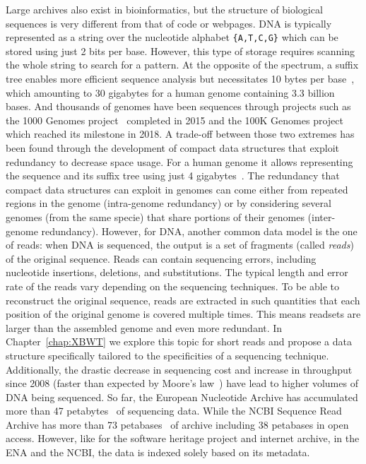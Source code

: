 Large archives also exist in bioinformatics, but the structure of biological sequences is very different from that of code or webpages.
DNA is typically represented as a string over the nucleotide alphabet \texttt{\{A,T,C,G\}} which can be stored using just 2 bits per base. However, this type of storage requires scanning the whole string to search for a pattern. 
At the opposite of the spectrum, a suffix tree enables more efficient sequence analysis but necessitates 10 bytes per base~\cite{navarro2016compact}, which amounting to 30 gigabytes for a human genome containing 3.3 billion bases. 
And thousands of genomes have been sequences through projects such as the 1000 Genomes project~\cite{10002015global} completed in 2015 and the 100K Genomes project~\cite{100Kgenomes} which reached its milestone in 2018. 
A trade-off between those two extremes has been found through the development of compact data structures that exploit redundancy to decrease space usage. For a human genome it allows representing the sequence and its suffix tree using just 4 gigabytes~\cite{navarro2016compact}.
The redundancy that compact data structures can exploit in genomes can come either from repeated regions in the genome (intra-genome redundancy) or by considering several genomes (from the same specie) that share portions of their genomes (inter-genome redundancy).  
However, for DNA, another common data model is the one of reads: when DNA is sequenced, the output is a set of fragments (called \emph{reads}) of the original sequence. Reads can contain sequencing errors, including nucleotide insertions, deletions, and substitutions. The typical length and error rate of the reads vary depending on the sequencing techniques. To be able to reconstruct the original sequence, reads are extracted in such quantities that each position of the original genome is covered multiple times. This means readsets are larger than the assembled genome and even more redundant. In Chapter~\ref{chap:XBWT} we explore this topic for short reads and propose a data structure specifically tailored to the specificities of a sequencing technique. 
Additionally, the drastic decrease in sequencing cost and increase in throughput since 2008 (faster than expected by Moore's law~\cite{muir2016real}) have lead to higher volumes of DNA being sequenced. 
So far, the European Nucleotide Archive has accumulated more than 47 petabytes~\cite{ena} of sequencing data.
While the NCBI Sequence Read Archive has more than 73 petabases~\cite{sra} of archive including 38 petabases in open access. However, like for the software heritage project and internet archive, in the ENA and the NCBI, the data is indexed solely based on its metadata.\\

